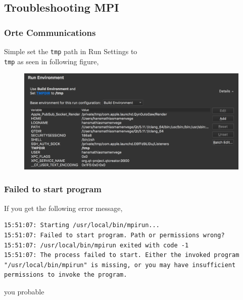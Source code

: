 \documentclass[11pt]{article}
\begin{document}
\subsection{Troubleshooting MPI}
\subsubsection{Orte Communications}
Simple set the \texttt{tmp} path in Run Settings to \texttt{\\tmp} as seen in following figure,
\begin{figure}[H]
    \centering
    \includegraphics[width=\textwidth]{figures/mpi/mpi_run_envoirement.png}
\end{figure}


\subsubsection{Failed to start program}
If you get the following error message,
\begin{lstlisting}
15:51:07: Starting /usr/local/bin/mpirun...
15:51:07: Failed to start program. Path or permissions wrong?
15:51:07: /usr/local/bin/mpirun exited with code -1
15:51:07: The process failed to start. Either the invoked program "/usr/local/bin/mpirun" is missing, or you may have insufficient permissions to invoke the program.
\end{lstlisting}
you probable 
\end{document}
